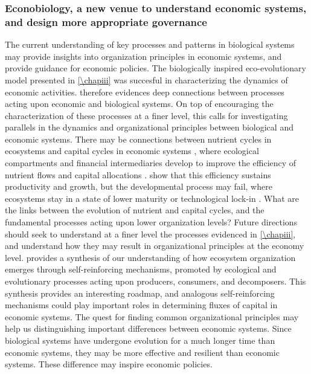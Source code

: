 \subsubsection{Econobiology, a new venue to understand economic systems, and design more appropriate governance}

The current understanding of key processes and patterns in biological systems may provide insights into organization principles in economic systems, and provide guidance for economic policies.
% 
The biologically inspired eco-evolutionary model presented in \cref{\chapiii} was succesful in characterizing the dynamics of economic activities. \Cref{\chapiii} therefore evidences deep connections between processes acting upon economic and biological systems. 
% 
On top of encouraging the characterization of these processes at a finer level, this calls for investigating parallels in the dynamics and organizational principles between biological and economic systems.
% 
% 
There may be connections between nutrient cycles in ecosystems \citep{Veldhuis2018} and capital cycles in economic systems \citep{King1993}, where ecological compartments and financial intermediaries develop to improve the efficiency of nutrient flows and capital allocations \citep{Odum1969}.
% 
\cite{Veldhuis2018,King1993} show that this efficiency sustains productivity and growth, but the developmental process may fail, where ecosystems stay in a state of lower maturity \citep{Margalef1963} or technological lock-in \citep{Hidalgo2009}. 
% 
What are the links between the evolution of nutrient and capital cycles, and the fundamental processes acting upon lower organization levels?
% 
% 
Future directions should seek to understand at a finer level the processes evidenced in \cref{\chapiii}, and understand how they may result in organizational principles at the economy level.
% 
\cite{Veldhuis2018} provides a synthesis of our understanding of how ecosystem organization emerges through self-reinforcing mechanisms, promoted by ecological and evolutionary processes acting upon producers, consumers, and decomposers. This synthesis provides an interesting roadmap, and analogous self-reinforcing mechanisms could play important roles in determining fluxes of capital in economic systems. 
% 
The quest for finding common organizational principles may help us distinguishing important differences between economic systems. Since biological systems have undergone evolution for a much longer time than economic systems, they may be more effective and resilient than economic systems. These difference may inspire economic policies.
